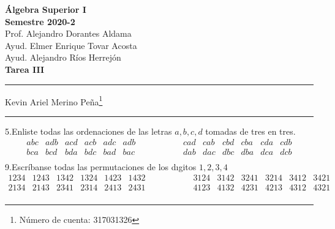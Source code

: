 \documentclass[letterpaper]{article}
\renewcommand{\*}{\cdot}
\theoremstyle{definition}
\begin{document}
\begin{center}
	\vspace{-114pt}
	\textbf{\large Álgebra Superior I}\\
	\textbf{ Semestre 2020-2}\\
	Prof. Alejandro Dorantes Aldama\\
	Ayud. Elmer Enrique Tovar Acosta \\
	Ayud. Alejandro Ríos Herrejón \\
	\textbf{Tarea III}
\rule{19cm}{0.2mm}
	\begin{center}
Kevin Ariel Merino Peña\footnote[2]{Número de cuenta: 317031326}
	\end{center}
	\vspace{-0.5cm}
\rule{19cm}{0.2mm}
\end{center}
\noindent5.Enliste todas las ordenaciones de las letras $ a, b, c, d $ tomadas de tres en tres.\\
$$ \begin{array}{cccccc}
abc & adb & acd & acb & adc & adb\\
bca & bcd & bda & bdc & bad & bac\\
\end{array} \hspace{2cm} \begin{array}{cccccc}
cad & cab & cbd & cba & cda & cdb\\
dab & dac & dbc & dba & dca & dcb\\
\end{array}$$
\noindent9.Escríbanse todas las permutaciones de los dıgitos $ 1, 2, 3, 4 $\\
\[
\begin{array}{cccccc}
 1234& 1243 & 1342 & 1324 & 1423 & 1432 \\
 2134 & 2143 & 2341 & 2314 & 2413& 2431\\
\end{array} \hspace{2cm} \begin{array}{cccccc}
 3124 & 3142 & 3241 & 3214 & 3412& 3421\\
4123 & 4132 & 4231 & 4213 & 4312 & 4321\\
\end{array}
\]
\end{document}
